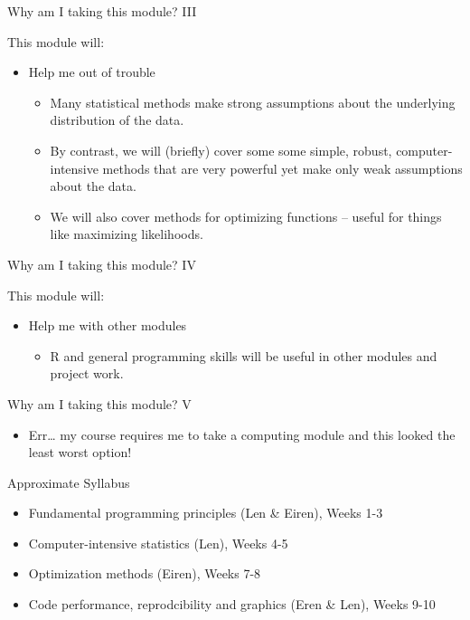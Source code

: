 \documentclass[ignorenonframetext,]{beamer}
\providecommand{\tightlist}{%
  \setlength{\itemsep}{0pt}\setlength{\parskip}{0pt}}
\begin{document}
\begin{frame}{Why am I taking this module? III}

This module will:

\begin{itemize}[<+->]
\tightlist
\item
  Help me out of trouble

  \begin{itemize}[<+->]
  \tightlist
  \item
    Many statistical methods make strong assumptions about the
    underlying distribution of the data.
  \item
    By contrast, we will (briefly) cover some some simple, robust,
    computer-intensive methods that are very powerful yet make only weak
    assumptions about the data.
  \item
    We will also cover methods for optimizing functions -- useful for
    things like maximizing likelihoods.
  \end{itemize}
\end{itemize}

\end{frame}

\begin{frame}{Why am I taking this module? IV}

This module will:

\begin{itemize}[<+->]
\tightlist
\item
  Help me with other modules

  \begin{itemize}[<+->]
  \tightlist
  \item
    R and general programming skills will be useful in other modules and
    project work.
  \end{itemize}
\end{itemize}

\end{frame}

\begin{frame}{Why am I taking this module? V}

\begin{itemize}[<+->]
\tightlist
\item
  Err\ldots{} my course requires me to take a computing module and this
  looked the least worst option!
\end{itemize}

\end{frame}

\begin{frame}{Approximate Syllabus}

\begin{itemize}[<+->]
\tightlist
\item
  Fundamental programming principles (Len \& Eiren), Weeks 1-3
\item
  Computer-intensive statistics (Len), Weeks 4-5
\item
  Optimization methods (Eiren), Weeks 7-8
\item
  Code performance, reprodcibility and graphics (Eren \& Len), Weeks
  9-10
\end{itemize}

\end{frame}
\end{document}
